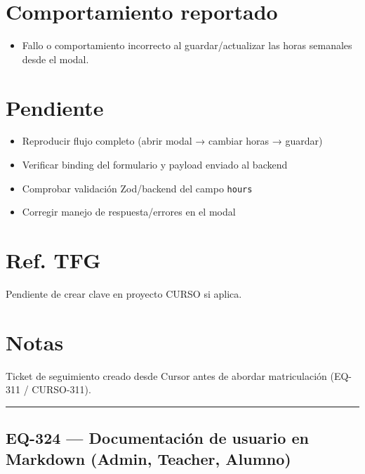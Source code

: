\documentclass[
  spanish,
  11pt,
]{report}
\providecommand{\tightlist}{%
  \setlength{\itemsep}{0pt}\setlength{\parskip}{0pt}}
\begin{document}
\section{Comportamiento reportado}\label{comportamiento-reportado}

\begin{itemize}
\tightlist
\item
  Fallo o comportamiento incorrecto al guardar/actualizar las horas
  semanales desde el modal.
\end{itemize}

\section{Pendiente}\label{pendiente}

\begin{itemize}
\tightlist
\item[$\square$]
  Reproducir flujo completo (abrir modal → cambiar horas → guardar)
\item[$\square$]
  Verificar binding del formulario y payload enviado al backend
\item[$\square$]
  Comprobar validación Zod/backend del campo \texttt{hours}
\item[$\square$]
  Corregir manejo de respuesta/errores en el modal
\end{itemize}

\section{Ref. TFG}\label{ref.-tfg}

Pendiente de crear clave en proyecto CURSO si aplica.

\section{Notas}\label{notas}

Ticket de seguimiento creado desde Cursor antes de abordar matriculación
(EQ-311 / CURSO-311).

\begin{center}\rule{0.5\linewidth}{0.5pt}\end{center}

\subsection{EQ-324 --- Documentación de usuario en Markdown (Admin,
Teacher,
Alumno)}\label{eq-324-documentaciuxf3n-de-usuario-en-markdown-admin-teacher-alumno}
\end{document}
